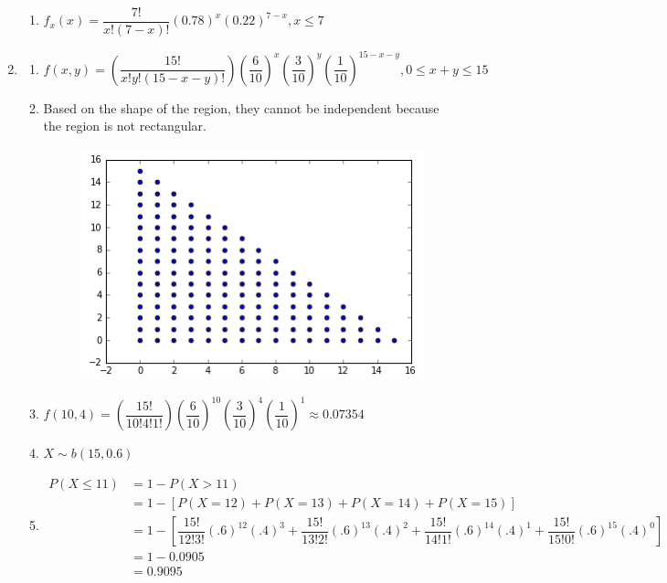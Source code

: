 \documentclass{article}
\newcommand\mfrac[2]{\left(\dfrac{#1}{#2}\right)}
\begin{document}
\begin{enumerate}
\begin{enumerate}
       \item
	$f_x(x) = \dfrac{7!}{x!(7-x)!}(0.78)^x(0.22)^{7-x}, x \le 7$
      \end{enumerate}
      
     \item
      \begin{enumerate}
       \item 
	$f(x,y) = \mfrac{15!}{x!y!(15-x-y)!}\mfrac{6}{10}^x\mfrac{3}{10}^y\mfrac{1}{10}^{15-x-y}
	  , 0 \le x+y \le 15$
       
       \item
	Based on the shape of the region, they cannot be independent because the region is not
	rectangular.
	
	\begin{figure}[h!]
	  \centering
	  \includegraphics[scale=.6,keepaspectratio=true]{./images/scatterPlot_XandY_lessThanEq_15.png}
	\end{figure}
       
       \item
	$f(10,4) = \mfrac{15!}{10!4!1!}\mfrac{6}{10}^{10}\mfrac{3}{10}^4\mfrac{1}{10}^1
	  \approx 0.07354$
       
       \item
	$X \sim b(15, 0.6)$
       
       \item
	\begin{align*}
	  P(X \le 11) &= 1 - P(X > 11) \\
	    &= 1 - [P(X = 12) + P(X = 13) + P(X = 14) + P(X = 15)] \\
	    &= 1 - \left[\dfrac{15!}{12!3!}(.6)^{12}(.4)^3 + \dfrac{15!}{13!2!}(.6)^{13}(.4)^2
	      + \dfrac{15!}{14!1!}(.6)^{14}(.4)^{1} + \dfrac{15!}{15!0!}(.6)^{15}(.4)^0 \right] \\
	    &= 1 - 0.0905 \\
	    &= 0.9095
	\end{align*}	
      \end{enumerate}
    \end{enumerate}
    
\end{document}
